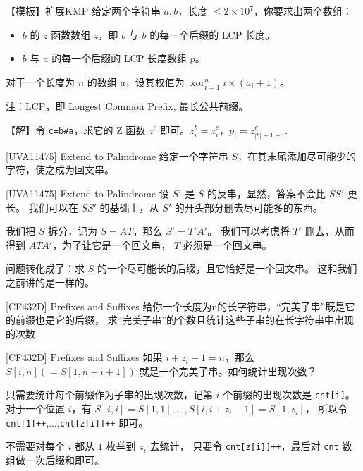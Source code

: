 \documentclass{beamer}
\begin{document}
\begin{frame}[fragile]{【模板】扩展KMP}
    \small
    给定两个字符串 $a,b$，长度 $\leq 2\times 10^7$，你要求出两个数组：

    \begin{itemize}
        \item $b$ 的 $z$ 函数数组 $z$，即 $b$ 与 $b$ 的每一个后缀的 LCP 长度。
        \item $b$ 与 $a$ 的每一个后缀的 LCP 长度数组 $p$。
    \end{itemize}

    对于一个长度为 $n$ 的数组 $a$，设其权值为 $\operatorname{xor}_{i=1}^n i \times (a_i + 1)$。

    \vspace{1em}
    注：LCP，即 Longest Common Prefix, 最长公共前缀。

    \vspace{1em}\pause

    【解】令 \verb|c=b#a|，求它的 Z 函数 $z^c$ 即可。$z^b_i=z^c_i$，$p_i=z^c_{|b|+1+i}$.
\end{frame}

\begin{frame}[fragile]{[UVA11475] Extend to Palindrome}
    \small
    给定一个字符串 $S$，在其末尾添加尽可能少的字符，使之成为回文串。
\end{frame}

\begin{frame}[fragile]{[UVA11475] Extend to Palindrome}
    \small
    设 $S'$ 是 $S$ 的反串，显然，答案不会比 $SS'$ 更长。
    我们可以在 $SS'$ 的基础上，从 $S'$ 的开头部分删去尽可能多的东西。

    \vspace{1em}\pause
    我们把 $S$ 拆分，记为 $S=AT$，那么 $S'=T'A'$。
    我们可以考虑将 $T'$ 删去，从而得到 $ATA'$，为了让它是一个回文串，
    $T$ 必须是一个回文串。

    \vspace{1em}\pause
    问题转化成了：求 $S$ 的一个尽可能长的后缀，且它恰好是一个回文串。
    这和我们之前讲的是一样的。
\end{frame}

\begin{frame}[fragile]{[CF432D] Prefixes and Suffixes}
    \small
    给你一个长度为n的长字符串，“完美子串”既是它的前缀也是它的后缀，
    求“完美子串”的个数且统计这些子串的在长字符串中出现的次数
\end{frame}

\begin{frame}[fragile]{[CF432D] Prefixes and Suffixes}
    \small
    如果 $i+z_i-1=n$，那么 $S[i,n](=S[1,n-i+1])$ 就是一个完美子串。如何统计出现次数？

    \vspace{1em}\pause
    只需要统计每个前缀作为子串的出现次数，记第 $i$ 个前缀的出现次数是 \verb|cnt[i]|。
    对于一个位置 $i$，有 $S[i,i]=S[1,1],...,S[i,i+z_i-1]=S[1,z_i]$，
    所以令 \verb|cnt[1]++|,...,\verb|cnt[z[i]]++| 即可。

    \vspace{1em}\pause
    不需要对每个 $i$ 都从 $1$ 枚举到 $z_i$ 去统计，
    只要令 \verb|cnt[z[i]]++|，最后对 \verb|cnt| 数组做一次后缀和即可。
\end{frame}
\end{document}
